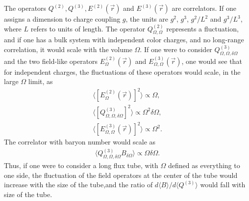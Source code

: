 \documentclass[aps, prc, 12pt, nofootinbib, showpacs, superscriptaddress, tightenlines, groupedaddress]{revtex4-2}
\begin{document}
The operators $Q^{(2)}, Q^{(3)},E^{(2)}(\vec{r})$ and $E^{(3)}(\vec{r})$ are correlators. If one assigns a dimension to charge coupling $g$, the units are $g^2$, $g^3$, $g^2/L^2$ and $g^3/L^3$, where $L$ refers to units of length. The operator $Q^{(2)}_{\Omega,\Omega}$ represents a fluctuation, and if one has a bulk system with independent color charges, and no long-range correlation, it would scale with the volume $\Omega$. If one were to consider $Q^{(3)}_{\Omega,\Omega,\delta\Omega}$ and the two field-like operators $E^{(2)}_{\Omega}(\vec{r})$ and $E^{(3)}_{\Omega,\Omega}(\vec{r})$, one would see that for independent charges, the fluctuations of these operators would scale, in the large $\Omega$ limit, as
\begin{eqnarray}
\langle [E^{(2)}_{\Omega}(\vec{r})]^2\rangle\propto \Omega,\\
\nonumber
\langle [Q^{(3)}_{\Omega,\Omega,\delta\Omega}]^2\rangle \propto \Omega^2\delta\Omega,\\
\nonumber
\langle [E^{(3)}_{\Omega,\Omega}(\vec{r})]^2\rangle\propto \Omega^2.
\end{eqnarray}
The correlator with baryon number would scale as
\begin{eqnarray}
\langle Q^{(3)}_{\Omega,\Omega,\delta\Omega}B_{\delta\Omega}\rangle\propto \Omega\delta\Omega.
\end{eqnarray}
Thus, if one were to consider a long flux tube, with $\Omega$ defined as everything to one side, the fluctuation of the field operators at the center of the tube would increase with the size of the tube,and the ratio of $d\langle B\rangle/d\langle Q^{(3)}\rangle$ would fall with size of the tube. 
\end{document}
